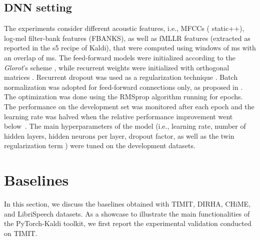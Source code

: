\documentclass{article}
\begin{document}
\subsection{DNN setting}
The experiments consider different acoustic features, i.e.,  MFCCs ( static++),  log-mel filter-bank features (FBANKS), as well as  fMLLR features \cite{mllr} (extracted as reported in the s5 recipe of Kaldi), that were computed using windows of  ms with an overlap of  ms.
The feed-forward models were initialized according to the \textit{Glorot}'s scheme \cite{xavier}, while recurrent weights were initialized with orthogonal matrices \cite{orth_init}. 
Recurrent dropout was used as a regularization technique \cite{drop_asru}. 
Batch normalization was adopted for feed-forward connections only, as proposed in \cite{ravanelli_is17}.
The optimization was done using the RMSprop algorithm running for  epochs. The performance on the development set was monitored after each epoch and the learning rate was halved when the relative performance improvement went below~.  
The main hyperparameters of the model (i.e., learning rate, number of hidden layers, hidden neurons per layer, dropout factor, as well as the twin regularization term ) were tuned on the development datasets. 

\section{Baselines}
In this section, we discuss the baselines obtained with TIMIT, DIRHA, CHiME, and LibriSpeech datasets. As a showcase to illustrate the main functionalities of the PyTorch-Kaldi toolkit, we first report the experimental validation conducted on TIMIT.
\end{document}
